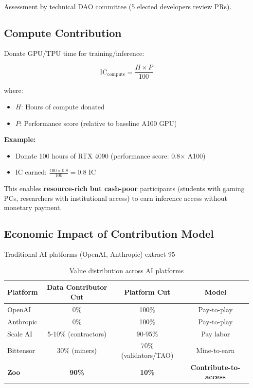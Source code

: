 Assessment by technical DAO committee (5 elected developers review PRs).

\subsection{Compute Contribution}

Donate GPU/TPU time for training/inference:

\begin{equation}
\text{IC}_{\text{compute}} = \frac{H \times P}{100}
\end{equation}

where:
\begin{itemize}
\item $H$: Hours of compute donated
\item $P$: Performance score (relative to baseline A100 GPU)
\end{itemize}

\textbf{Example:}
\begin{itemize}
\item Donate 100 hours of RTX 4090 (performance score: 0.8× A100)
\item IC earned: $\frac{100 \times 0.8}{100} = 0.8$ IC
\end{itemize}

This enables \textbf{resource-rich but cash-poor} participants (students with gaming PCs, researchers with institutional access) to earn inference access without monetary payment.

\subsection{Economic Impact of Contribution Model}

Traditional AI platforms (OpenAI, Anthropic) extract 95%

\begin{table}[h]
\centering
\begin{tabular}{lccc}
\toprule
\textbf{Platform} & \textbf{Data Contributor Cut} & \textbf{Platform Cut} & \textbf{Model} \\
\midrule
OpenAI & 0\% & 100\% & Pay-to-play \\
Anthropic & 0\% & 100\% & Pay-to-play \\
Scale AI & 5-10\% (contractors) & 90-95\% & Pay labor \\
Bittensor & 30\% (miners) & 70\% (validators/TAO) & Mine-to-earn \\
\textbf{Zoo} & \textbf{90\%} & \textbf{10\%} & \textbf{Contribute-to-access} \\
\bottomrule
\end{tabular}
\caption{Value distribution across AI platforms}
\label{tab:value_dist}
\end{table}

